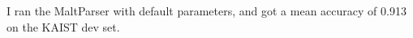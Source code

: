 I ran the MaltParser with default parameters, and got a mean accuracy of
\num{0.913} on the KAIST dev set.
